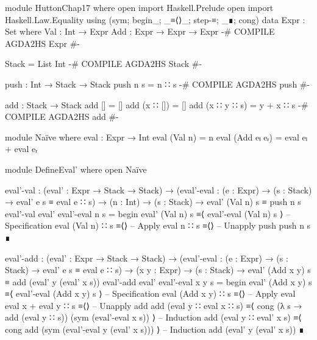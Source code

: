 \documentclass{article}
\begin{document}
\begin{code}
module HuttonChap17 where
open import Haskell.Prelude
open import Haskell.Law.Equality using (sym; begin_; _≡⟨⟩_; step-≡; _∎; cong)
data Expr : Set where
    Val : Int → Expr
    Add : Expr → Expr → Expr
{-# COMPILE AGDA2HS Expr #-}

Stack = List Int
{-# COMPILE AGDA2HS Stack #-}

push : Int → Stack → Stack
push n s = n ∷ s
{-# COMPILE AGDA2HS push #-}

add : Stack → Stack
add [] = []
add (x ∷ []) = []
add (x ∷ y ∷ s) = y + x ∷ s
{-# COMPILE AGDA2HS add #-}

module Naïve where
  eval : Expr → Int
  eval (Val n) = n
  eval (Add eₗ eᵣ) = eval eₗ + eval eᵣ

module DefineEval' where
  open Naïve

  eval'-val : (eval' : Expr → Stack → Stack)
    → (eval'-eval : (e : Expr) → (s : Stack) → eval' e s ≡ eval e ∷ s)
    → (n : Int) → (s : Stack) → eval' (Val n) s ≡ push n s
  eval'-val eval' eval'-eval n s =
    begin
      eval' (Val n) s
    ≡⟨ eval'-eval (Val n) s ⟩ -- Specification
      eval (Val n) ∷ s
    ≡⟨⟩ -- Apply eval
      n ∷ s
    ≡⟨⟩ -- Unapply push
      push n s
    ∎
\end{code}
\begin{code}
  eval'-add : (eval' : Expr → Stack → Stack)
    → (eval'-eval : (e : Expr) → (s : Stack) → eval' e s ≡ eval e ∷ s)
    → (x y : Expr) → (s : Stack)
    → eval' (Add x y) s ≡ add (eval' y (eval' x s))
  eval'-add eval' eval'-eval x y s =
    begin
      eval' (Add x y) s
    ≡⟨ eval'-eval (Add x y) s ⟩ -- Specification
      eval (Add x y) ∷ s
    ≡⟨⟩ -- Apply eval
      eval x + eval y ∷ s
    ≡⟨⟩ -- Unapply add
      add (eval y ∷ eval x ∷ s)
    ≡⟨ cong (λ s → add (eval y ∷ s)) (sym (eval'-eval x s)) ⟩ -- Induction
      add (eval y ∷ eval' x s)
    ≡⟨ cong add (sym (eval'-eval y (eval' x s))) ⟩ -- Induction
      add (eval' y (eval' x s))
    ∎
\end{code}
\end{document}
